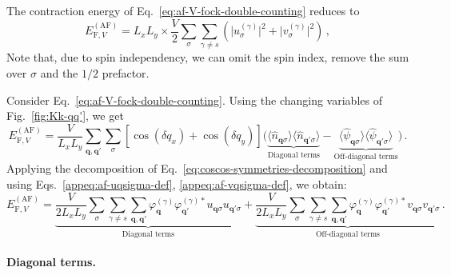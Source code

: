 The contraction energy of Eq.~\eqref{eq:af-V-fock-double-counting} reduces to
\begin{equation}\label{eq:af-HV-fock-Ec}
	E_{\mathrm{F},V}^{(\mathrm{AF})} = L_x L_y \times \frac{V}{2} \sum_\sigma \sum_{\gamma \neq s} \left(
	\big|u^{(\gamma)}_\sigma\big|^2 + \big|v^{(\gamma)}_\sigma\big|^2
	\right) \, ,
\end{equation}
Note that, due to spin independency, we can omit the spin index, remove the sum over $\sigma$ and the $1/2$ prefactor.

\begin{tabproof}
	
	Consider Eq.~\eqref{eq:af-V-fock-double-counting}. Using the changing variables of Fig.~\ref{fig:Kk-qq'}, we get
	\[
	E_{\mathrm{F},V}^{(\mathrm{AF})} = \frac{V}{L_x L_y} \sum_{\mathbf{q}, \mathbf{q}'} \sum_\sigma \left[
	\cos \left(
	\delta q_x
	\right)	+ \cos \left(
	\delta q_y
	\right)	
	\right]
	\Big(
	\underbrace{
		\langle
		\hat n_{\mathbf{q}\sigma}
		\rangle \langle
		\hat n_{\mathbf{q}'\sigma}
		\rangle
	}_\text{Diagonal terms}
	-
	\underbrace{
		\langle
		\hat \psi_{\mathbf{q}\sigma}
		\rangle \langle
		\hat \psi_{\mathbf{q}'\sigma}
		\rangle
	}_\text{Off-diagonal terms}
	\Big) \, .
	\]
	Applying the decomposition of Eq.~\eqref{eq:coscos-symmetries-decomposition} and using Eqs.~\eqref{appeq:af-uqsigma-def}, \eqref{appeq:af-vqsigma-def}, we obtain:
	\begin{equation}\label{eq:af-V-fock-double-counting-int2}
		E_{\mathrm{F},V}^{(\mathrm{AF})} =  
		\underbrace{
			\frac{V}{2 L_x L_y} \sum_\sigma \sum_{\gamma \neq s} \sum_{\mathbf{q}, \mathbf{q}'} \varphi_{\mathbf{q}}^{(\gamma)} \varphi_{\mathbf{q}'}^{(\gamma)*}
			u_{\mathbf{q}\sigma} u_{\mathbf{q}'\sigma} 
		}_\text{Diagonal terms}
		+
		\underbrace{
			\frac{V}{2 L_x L_y} \sum_\sigma \sum_{\gamma \neq s} \sum_{\mathbf{q}, \mathbf{q}'} \varphi_{\mathbf{q}}^{(\gamma)} \varphi_{\mathbf{q}'}^{(\gamma)*}
			v_{\mathbf{q}\sigma} v_{\mathbf{q}'\sigma}
		}_\text{Off-diagonal terms} \, .
	\end{equation}
	
	\paragraph{Diagonal terms.}
	

\end{tabproof}
